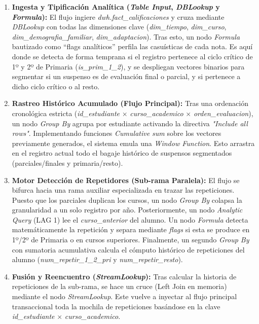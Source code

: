 \begin{enumerate}
    \item \textbf{Ingesta y Tipificación Analítica (\textit{Table Input}, \textit{DBLookup} y \textit{Formula}):} El flujo ingiere \textit{dwh.fact\_calificaciones} y cruza mediante \textit{DBLookup} con todas las dimensiones clave (\textit{dim\_tiempo}, \textit{dim\_curso}, \textit{dim\_demografia\_familiar}, \textit{dim\_adaptacion}). Tras esto, un nodo \textit{Formula} bautizado como ``flags analíticos'' perfila las casuísticas de cada nota. Es aquí donde se detecta de forma temprana si el registro pertenece al ciclo crítico de 1º y 2º de Primaria (\textit{is\_prim\_1\_2}), y se despliegan vectores binarios para segmentar si un suspenso es de evaluación final o parcial, y si pertenece a dicho ciclo crítico o al resto.
    \item \textbf{Rastreo Histórico Acumulado (Flujo Principal):} Tras una ordenación cronológica estricta (\textit{id\_estudiante} $\times$ \textit{curso\_academico} $\times$ \textit{orden\_evaluacion}), un nodo \textit{Group By} agrupa por estudiante activando la directiva \textit{"Include all rows"}. Implementando funciones \textit{Cumulative sum} sobre los vectores previamente generados, el sistema emula una \textit{Window Function}. Esto arrastra en el registro actual todo el bagaje histórico de suspensos segmentados (parciales/finales y primaria/resto).
    \item \textbf{Motor Detección de Repetidores (Sub-rama Paralela):} El flujo se bifurca hacia una rama auxiliar especializada en trazar las repeticiones. Puesto que los parciales duplican los cursos, un nodo \textit{Group By} colapsa la granularidad a un solo registro por año. Posteriormente, un nodo \textit{Analytic Query} (LAG 1) lee el \textit{curso\_anterior} del alumno. Un nodo \textit{Formula} detecta matemáticamente la repetición y separa mediante \textit{flags} si esta se produce en 1º/2º de Primaria o en cursos superiores. Finalmente, un segundo \textit{Group By} con sumatoria acumulativa calcula el cómputo histórico de repeticiones del alumno (\textit{num\_repetir\_1\_2\_pri} y \textit{num\_repetir\_resto}).
    \item \textbf{Fusión y Reencuentro (\textit{StreamLookup}):} Tras calcular la historia de repeticiones de la sub-rama, se hace un cruce (Left Join en memoria) mediante el nodo \textit{StreamLookup}. Este vuelve a inyectar al flujo principal transaccional toda la mochila de repeticiones basándose en la clave \textit{id\_estudiante} $\times$ \textit{curso\_academico}.

\end{enumerate}
